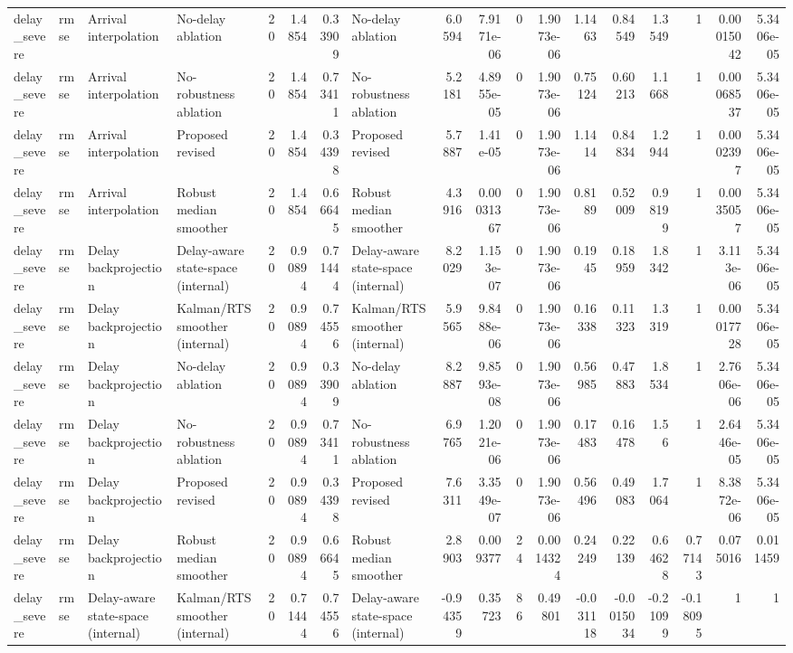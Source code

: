\begin{table}[!htbp]
{\begin{tabular}{llllrrrlrrrrrrrrrr}
delay_severe & rmse & Arrival interpolation & No-delay ablation & 20 & 1.4854 & 0.33909 & No-delay ablation & 6.0594 & 7.9171e-06 & 0 & 1.9073e-06 & 1.1463 & 0.84549 & 1.3549 & 1 & 0.00015042 & 5.3406e-05 \\
delay_severe & rmse & Arrival interpolation & No-robustness ablation & 20 & 1.4854 & 0.73411 & No-robustness ablation & 5.2181 & 4.8955e-05 & 0 & 1.9073e-06 & 0.75124 & 0.60213 & 1.1668 & 1 & 0.00068537 & 5.3406e-05 \\
delay_severe & rmse & Arrival interpolation & Proposed revised & 20 & 1.4854 & 0.34398 & Proposed revised & 5.7887 & 1.41e-05 & 0 & 1.9073e-06 & 1.1414 & 0.84834 & 1.2944 & 1 & 0.0002397 & 5.3406e-05 \\
delay_severe & rmse & Arrival interpolation & Robust median smoother & 20 & 1.4854 & 0.66645 & Robust median smoother & 4.3916 & 0.00031367 & 0 & 1.9073e-06 & 0.8189 & 0.52009 & 0.98199 & 1 & 0.0035057 & 5.3406e-05 \\
delay_severe & rmse & Delay backprojection & Delay-aware state-space (internal) & 20 & 0.90894 & 0.71444 & Delay-aware state-space (internal) & 8.2029 & 1.153e-07 & 0 & 1.9073e-06 & 0.1945 & 0.18959 & 1.8342 & 1 & 3.113e-06 & 5.3406e-05 \\
delay_severe & rmse & Delay backprojection & Kalman/RTS smoother (internal) & 20 & 0.90894 & 0.74556 & Kalman/RTS smoother (internal) & 5.9565 & 9.8488e-06 & 0 & 1.9073e-06 & 0.16338 & 0.11323 & 1.3319 & 1 & 0.00017728 & 5.3406e-05 \\
delay_severe & rmse & Delay backprojection & No-delay ablation & 20 & 0.90894 & 0.33909 & No-delay ablation & 8.2887 & 9.8593e-08 & 0 & 1.9073e-06 & 0.56985 & 0.47883 & 1.8534 & 1 & 2.7606e-06 & 5.3406e-05 \\
delay_severe & rmse & Delay backprojection & No-robustness ablation & 20 & 0.90894 & 0.73411 & No-robustness ablation & 6.9765 & 1.2021e-06 & 0 & 1.9073e-06 & 0.17483 & 0.16478 & 1.56 & 1 & 2.6446e-05 & 5.3406e-05 \\
delay_severe & rmse & Delay backprojection & Proposed revised & 20 & 0.90894 & 0.34398 & Proposed revised & 7.6311 & 3.3549e-07 & 0 & 1.9073e-06 & 0.56496 & 0.49083 & 1.7064 & 1 & 8.3872e-06 & 5.3406e-05 \\
delay_severe & rmse & Delay backprojection & Robust median smoother & 20 & 0.90894 & 0.66645 & Robust median smoother & 2.8903 & 0.009377 & 24 & 0.0014324 & 0.24249 & 0.22139 & 0.64628 & 0.77143 & 0.075016 & 0.011459 \\
delay_severe & rmse & Delay-aware state-space (internal) & Kalman/RTS smoother (internal) & 20 & 0.71444 & 0.74556 & Delay-aware state-space (internal) & -0.94359 & 0.35723 & 86 & 0.49801 & -0.031118 & -0.0015034 & -0.21099 & -0.18095 & 1 & 1 \\

\end{tabular}}
\end{table}
